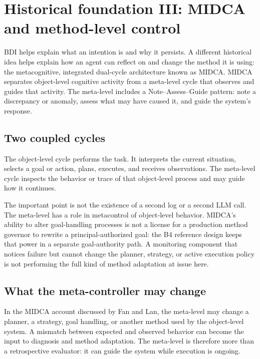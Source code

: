 \section{Historical foundation III: MIDCA and method-level control}
\label{sec:ch15-midca}

BDI helps explain what an intention is and why it persists. A different historical idea helps explain how an agent can reflect on and change the method it is using: the metacognitive, integrated dual-cycle architecture known as MIDCA. MIDCA separates object-level cognitive activity from a meta-level cycle that observes and guides that activity. The meta-level includes a Note--Assess--Guide pattern: note a discrepancy or anomaly, assess what may have caused it, and guide the system's response.\autocite{cox2016midca}

\subsection{Two coupled cycles}

The object-level cycle performs the task. It interprets the current situation, selects a goal or action, plans, executes, and receives observations. The meta-level cycle inspects the behavior or trace of that object-level process and may guide how it continues.

The important point is not the existence of a second log or a second LLM call. The meta-level has a role in \gls{metacontrol} of object-level behavior. MIDCA's ability to alter goal-handling processes is not a license for a production method governor to rewrite a principal-authorized goal: the B4 reference design keeps that power in a separate goal-authority path. A monitoring component that notices failure but cannot change the planner, strategy, or active execution policy is not performing the full kind of method adaptation at issue here.


\subsection{What the meta-controller may change}

In the MIDCA account discussed by Fan and Lan, the meta-level may change a planner, a strategy, goal handling, or another method used by the object-level system. A mismatch between expected and observed behavior can become the input to diagnosis and method adaptation. The meta-level is therefore more than a retrospective evaluator: it can guide the system while execution is ongoing.

